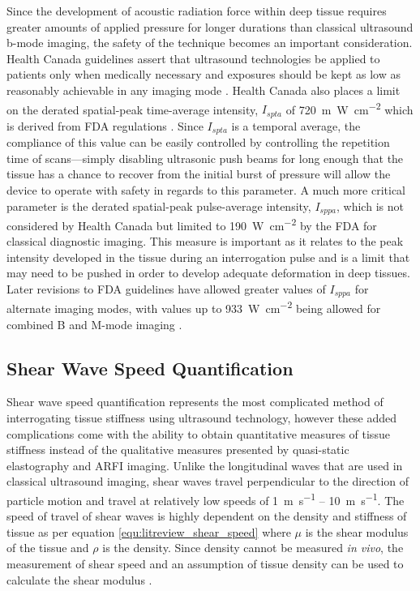 			Since the development of acoustic radiation force within deep tissue requires greater amounts of applied pressure for longer durations than classical ultrasound b-mode imaging, the safety of the technique becomes an important consideration. Health Canada guidelines assert that ultrasound technologies be applied to patients only when medically necessary and exposures should be kept as low as reasonably achievable in any imaging mode \cite{HealthCanadaUltrasound}. Health Canada also places a limit on the derated spatial-peak time-average intensity, $I_{spta}$ of \SI{720}{\m\W\per\cm\squared} which is derived from FDA regulations \cite{FDAUltrasoundGuidelines}. Since $I_{spta}$ is a temporal average, the compliance of this value can be easily controlled by controlling the repetition time of scans---simply disabling ultrasonic push beams for long enough that the tissue has a chance to recover from the initial burst of pressure will allow the device to operate with safety in regards to this parameter. A much more critical parameter is the derated spatial-peak pulse-average intensity, $I_{sppa}$, which is not considered by Health Canada but limited to \SI{190}{\W\per\cm\squared} by the FDA \cite{FDAUltrasoundGuidelines} for classical diagnostic imaging. This measure is important as it relates to the peak intensity developed in the tissue during an interrogation pulse and is a limit that may need to be pushed in order to develop adequate deformation in deep tissues. Later revisions to FDA guidelines have allowed greater values of $I_{sppa}$ for alternate imaging modes, with values up to \SI{933}{\W\per\cm\squared} being allowed for combined B and M-mode imaging \cite{hoskins10}.

		\subsection{Shear Wave Speed Quantification}
			Shear wave speed quantification represents the most complicated method of interrogating tissue stiffness using ultrasound technology, however these added complications come with the ability to obtain quantitative measures of tissue stiffness instead of the qualitative measures presented by quasi-static elastography and ARFI imaging. Unlike the longitudinal waves that are used in classical ultrasound imaging, shear waves travel perpendicular to the direction of particle motion and travel at relatively low speeds of \SI{1}{\m\per\s} -- \SI{10}{\m\per\s}. The speed of travel of shear waves is highly dependent on the density and stiffness of tissue as per equation \ref{equ:litreview_shear_speed} where $\mu$ is the shear modulus of the tissue and $\rho$ is the density. Since density cannot be measured \emph{in vivo}, the measurement of shear speed and an assumption of tissue density can be used to calculate the shear modulus \cite{hoskins10}.

